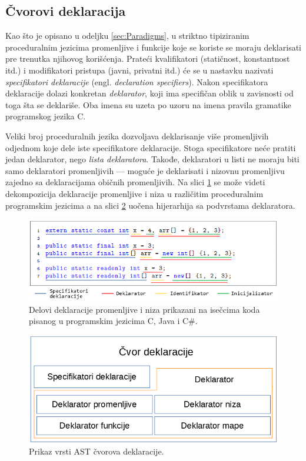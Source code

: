 \subsection{Čvorovi deklaracija}
\label{subsec:MyASTDeclarationNodes}

Kao što je opisano u odeljku \ref{sec:Paradigms}, u striktno tipiziranim proceduralnim jezicima promenljive i funkcije koje se koriste se moraju deklarisati pre trenutka njihovog korišćenja. Prateći kvalifikatori (statičnost, konstantnost itd.) i modifikatori pristupa (javni, privatni itd.) će se u nastavku nazivati \emph{specifikatori deklaracije} (engl. \emph{declaration specifiers}). Nakon specifikatora deklaracije dolazi konkretan \emph{deklarator}, koji ima specifičan oblik u zavisnosti od toga šta se deklariše. Oba imena su uzeta po uzoru na imena pravila gramatike programskog jezika C. 

Veliki broj proceduralnih jezika dozvoljava deklarisanje više promenljivih odjednom koje dele iste specifikatore deklaracije. Stoga specifikatore neće pratiti jedan deklarator, nego \emph{lista deklaratora}. Takođe, deklaratori u listi ne moraju biti samo deklaratori promenljivih --- moguće je deklarisati i nizovnu promenljivu zajedno sa deklaracijama običnih promenljivih. Na slici \ref{fig:DeclarationParts} se može videti dekompozicija deklaracije promenljive i niza u različitim proceduralnim programskim jezicima a na slici \ref{fig:DeclarationNodes} uočena hijerarhija sa podvrstama deklaratora.

\begin{figure}[h!]
\centering
\includegraphics[scale=0.8]{images/declaration_decomposition.png}
\caption{Delovi deklaracije promenljive i niza prikazani na isečcima koda pisanog u programskim jezicima C, Java i C\#.}
\label{fig:DeclarationParts}
\end{figure}

\begin{figure}[h!]
\centering
\includegraphics[scale=0.5]{images/declaration_nodes.png}
\caption{Prikaz vrsti AST čvorova deklaracije.}
\label{fig:DeclarationNodes}
\end{figure}

